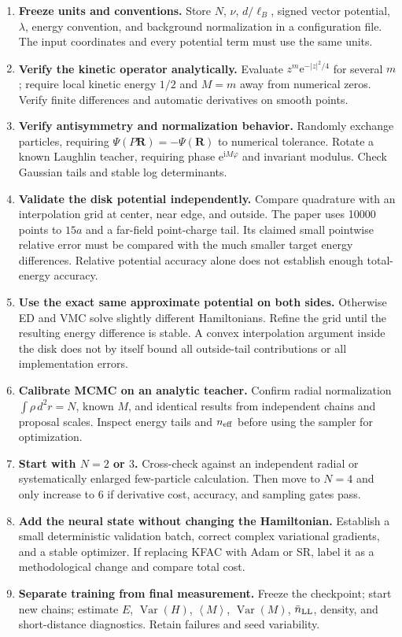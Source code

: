 \documentclass[11pt,letterpaper]{article}
\newcommand{\R}{\mathbf R}
\newcommand{\ee}{\mathrm e}
\newcommand{\ii}{\mathrm i}
\newcommand{\avg}[1]{\left\langle #1\right\rangle}
\begin{document}
\begin{enumerate}
\item \textbf{Freeze units and conventions.} Store $N$, $\nu$, $d/\ell_B$, signed vector potential, $\lambda$, energy convention, and background normalization in a configuration file. The input coordinates and every potential term must use the same units.
\item \textbf{Verify the kinetic operator analytically.} Evaluate $z^m\ee^{-|z|^2/4}$ for several $m$; require local kinetic energy $1/2$ and $M=m$ away from numerical zeros. Verify finite differences and automatic derivatives on smooth points.
\item \textbf{Verify antisymmetry and normalization behavior.} Randomly exchange particles, requiring $\Psi(P\R)=-\Psi(\R)$ to numerical tolerance. Rotate a known Laughlin teacher, requiring phase $\ee^{\ii M\varphi}$ and invariant modulus. Check Gaussian tails and stable log determinants.
\item \textbf{Validate the disk potential independently.} Compare quadrature with an interpolation grid at center, near edge, and outside. The paper uses 10000 points to $15a$ and a far-field point-charge tail. Its claimed small pointwise relative error must be compared with the much smaller target energy differences. Relative potential accuracy alone does not establish enough total-energy accuracy.
\item \textbf{Use the exact same approximate potential on both sides.} Otherwise ED and VMC solve slightly different Hamiltonians. Refine the grid until the resulting energy difference is stable. A convex interpolation argument inside the disk does not by itself bound all outside-tail contributions or all implementation errors.
\item \textbf{Calibrate MCMC on an analytic teacher.} Confirm radial normalization $\int\rho\,d^2r=N$, known $M$, and identical results from independent chains and proposal scales. Inspect energy tails and $n_{\rm eff}$ before using the sampler for optimization.
\item \textbf{Start with $N=2$ or $3$.} Cross-check against an independent radial or systematically enlarged few-particle calculation. Then move to $N=4$ and only increase to $6$ if derivative cost, accuracy, and sampling gates pass.
\item \textbf{Add the neural state without changing the Hamiltonian.} Establish a small deterministic validation batch, correct complex variational gradients, and a stable optimizer. If replacing KFAC with Adam or SR, label it as a methodological change and compare total cost.
\item \textbf{Separate training from final measurement.} Freeze the checkpoint; start new chains; estimate $E$, $\operatorname{Var}(H)$, $\avg M$, $\operatorname{Var}(M)$, $\bar n_{\rm LL}$, density, and short-distance diagnostics. Retain failures and seed variability.
\end{enumerate}
\end{document}
